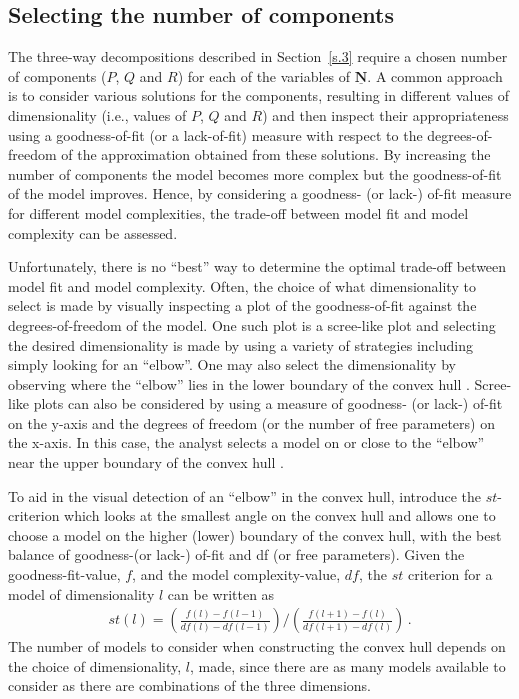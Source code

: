 \subsection{Selecting the number of components}
The three-way decompositions described in Section~\ref{s.3} require a chosen number of components ($P$, $Q$ and $R$) for each of the variables of $\mathbf{\underline{N}}$.
A common approach is to consider various solutions for the components, resulting in different values of dimensionality (i.e., values of $P$, $Q$ and $R$) and then inspect their appropriateness using a goodness-of-fit (or a lack-of-fit) measure with respect to the degrees-of-freedom of the approximation obtained from these solutions. By increasing the number of components the model becomes more complex but the goodness-of-fit of the model improves. Hence, by considering a goodness- (or lack-) of-fit measure for different model complexities, the trade-off between model fit and model complexity can be assessed. 

Unfortunately, there is no ``best'' way to determine the optimal trade-off between model fit and model complexity. Often, the choice of what dimensionality to select is made by visually inspecting a plot of the goodness-of-fit against the degrees-of-freedom of the model. One such plot is a scree-like plot and selecting the desired dimensionality is made by using a variety of strategies including simply looking for an ``elbow''. One may also select the dimensionality by observing where the ``elbow'' lies in the lower boundary of the convex hull \cite[]{krooor03,murkro03,kro08}. Scree-like plots can also be considered by using a measure of goodness- (or lack-) of-fit on the y-axis and the degrees of freedom (or the number of free parameters) on the x-axis. In this case, the analyst selects a model on or close to the ``elbow'' near the upper boundary of the convex hull \cite[]{timkie00,ceukie06}.

To aid in the visual detection of an ``elbow'' in the convex hull, \citet[]{ceukie06} introduce the $st$-criterion which looks at the smallest angle on the convex hull and allows one to choose a model on the higher (lower) boundary of the convex hull, with the best balance of goodness-(or lack-) of-fit and df (or free parameters). Given the goodness-fit-value, $f$, and the model complexity-value, $df$, the $st$ criterion for a model of dimensionality $l$ can be written as 
\begin{eqnarray}
st(l)=\left(\frac{f(l)-f(l-1)}{df(l)-df(l-1)}\right)/\left(\frac{f(l+1)-f(l)}{df(l+1)-df(l)}\right) \, .
\label{eq:st}
\end{eqnarray}
\noindent The number of models to consider when constructing the convex hull depends on the choice of dimensionality, $l$, made, since there are as many models available to consider as there are combinations of the three dimensions. 

